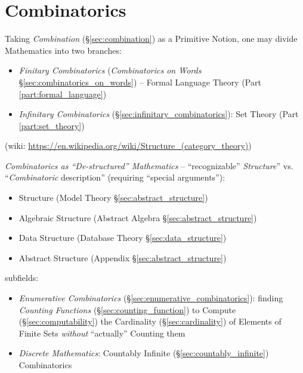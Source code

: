 \part{Combinatorics}\label{part:combinatorics}

Taking \emph{Combination} (\S\ref{sec:combination}) as a Primitive Notion, one
may divide Mathematics into two branches:
\begin{itemize}
  \item \emph{Finitary Combinatorics} (\emph{Combinatorics on Words}
    \S\ref{sec:combinatorics_on_words}) -- Formal Language Theory (Part
    \ref{part:formal_language})
  \item \emph{Infinitary Combinatorics} (\S\ref{sec:infinitary_combinatorics}):
    Set Theory (Part \ref{part:set_theory})
\end{itemize}

(wiki: \url{https://en.wikipedia.org/wiki/Structure_(category_theory)})

\emph{Combinatorics as ``De-structured'' Mathematics} -- ``recognizable''
\emph{Structure}'' vs. ``\emph{Combinatoric} description'' (requiring ``special
arguments''):
\begin{itemize}
  \item Structure (Model Theory \S\ref{sec:abstract_structure})
  \item Algebraic Structure (Abstract Algebra \S\ref{sec:abstract_structure})
  \item Data Structure (Database Theory \S\ref{sec:data_structure})
  \item Abstract Structure (Appendix \S\ref{sec:abstract_structure})
\end{itemize}

subfields:
\begin{itemize}
\item \emph{Enumerative Combinatorics} (\S\ref{sec:enumerative_combinatorics}):
  finding \emph{Counting Functions} (\S\ref{sec:counting_function}) to Compute
  (\S\ref{sec:computability}) the Cardinality (\S\ref{sec:cardinality}) of
  Elements of Finite Sets \emph{without} ``actually'' Counting them
\item \emph{Discrete Mathematics}: Countably Infinite
  (\S\ref{sec:countably_infinite}) Combinatorics
\end{itemize}

